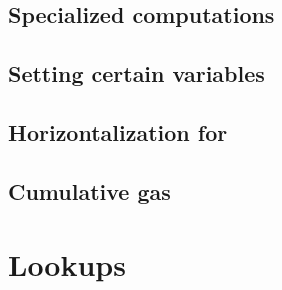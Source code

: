 \subsection{Specialized computations}                                       \label{user txn data: constraints: specialized computations}       
\subsection{Setting certain variables}                                      \label{user txn data: constraints: setting variables}              
\subsection{Horizontalization for \rlpTxnRcptMod{}}                         \label{user txn data: constraints: horizontalization rlpTxnRcpt}   
\subsection{Cumulative gas}                                                 \label{user txn data: constraints: cumulative gas}                 

\section{Lookups}                                                           \label{user txn data: lookups}                                     
